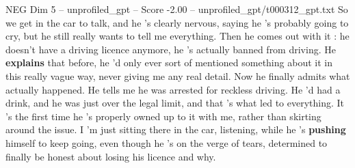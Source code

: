 \begin{textsample}{NEG Dim 5 – unprofiled\_gpt – Score -2.00 – unprofiled\_gpt/t000312\_gpt.txt}  \label{ex:f5_neg_003}
So we get in the car to talk, and he ’s clearly nervous, saying he ’s probably going to cry, but he still really wants to tell me everything.
Then he comes out with it : he doesn't have a driving licence anymore, he ’s actually banned from driving.
He \textbf{explains} that before, he ’d only ever sort of mentioned something about it in this really vague way, never giving me any real detail.
Now he finally admits what actually happened.
He tells me he was arrested for reckless driving.
He ’d had a drink, and he was just over the legal limit, and that ’s what led to everything.
It ’s the first time he ’s properly owned up to it with me, rather than skirting around the issue.
I ’m just sitting there in the car, listening, while he ’s \textbf{pushing} himself to keep going, even though he ’s on the verge of tears, determined to finally be honest about losing his licence and why.

\end{textsample}
